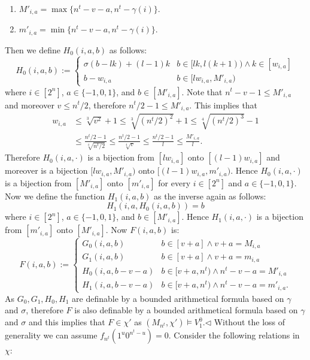 \documentclass[10pt,a4paper]{article}
\begin{document}
\begin{enumerate}
\item $M'_{i,a}=\max\{n^t-v-a,n^t-\gamma(i)\}$.
\item $m'_{i,a}=\min\{n^t-v-a,n^t-\gamma(i)\}$.
\end{enumerate}
Then we define $H_0(i,a,b)$ as follows:
\[H_0(i,a,b):=\begin{cases}\sigma(b-lk)+(l-1)k&b\in[lk,l(k+1))\wedge k\in[w_{i,a}]\\b-w_{i,a}&b\in[lw_{i,a},M'_{i,a})\end{cases}\]
where $i\in[2^n]$, $a\in\{-1,0,1\}$, and $b\in[M'_{i,a}]$.
Note that $n^t-v-1\leq M'_{i,a}$ and moreover $v\leq n^t/2$, therefore $n^t/2-1\leq M'_{i,a}$. This implies that
\begin{align*}
w_{i,a}&\leq\sqrt[3]{v^2}+1\leq\sqrt[3]{(n^t/2)^2}+1\leq\sqrt[4]{(n^t/2)^3}-1\\
&\leq\frac{n^t/2-1}{\sqrt[4]{n^t/2}}\leq\frac{n^t/2-1}{\sqrt[4]v}\leq\frac{n^t/2-1}l\leq\frac{M'_{i,a}}l.
\end{align*}
Therefore $H_0(i,a,\cdot)$ is a bijection from $[lw_{i,a}]$ onto $[(l-1)w_{i,a}]$ and moreover is a bijection $[lw_{i,a},M'_{i,a})$ onto $[(l-1)w_{i,a},m'_{i,a})$. Hence $H_0(i,a,\cdot)$ is a bijection from $[M'_{i,a}]$ onto $[m'_{i,a}]$ for every $i\in[2^n]$ and $a\in\{-1,0,1\}$. Now we define the function $H_1(i,a,b)$ as the inverse again as follows:
\[H_1(i,a,H_0(i,a,b))=b\]
where $i\in[2^n]$, $a\in\{-1,0,1\}$, and $b\in[M'_{i,a}]$. Hence $H_1(i,a,\cdot)$ is a bijection from $[m'_{i,a}]$ onto $[M'_{i,a}]$.
Now $F(i,a,b)$ is:
\[F(i,a,b):=\begin{cases}G_0(i,a,b)&b\in[v+a]\wedge v+a=M_{i,a}\\G_1(i,a,b)&b\in[v+a]\wedge v+a=m_{i,a}\\H_0(i,a,b-v-a)&b\in[v+a,n^t)\wedge n^t-v-a=M'_{i,a}\\H_1(i,a,b-v-a)&b\in[v+a,n^t)\wedge n^t-v-a=m'_{i,a}.\end{cases}\]
As $G_0,G_1,H_0,H_1$ are definable by a bounded arithmetical formula based on $\gamma$ and $\sigma$, therefore $F$ is also definable by a bounded arithmetical formula based on $\gamma$ and $\sigma$ and this implies that $F\in\chi'$ as $(M_{n^t},\chi')\models V_1^0$.\hfill$\triangleleft$
Without the loss of generality we can assume $f_{n^t}(1^u0^{n^t-u})=0$. Consider the following relations in $\chi$:
\end{document}
